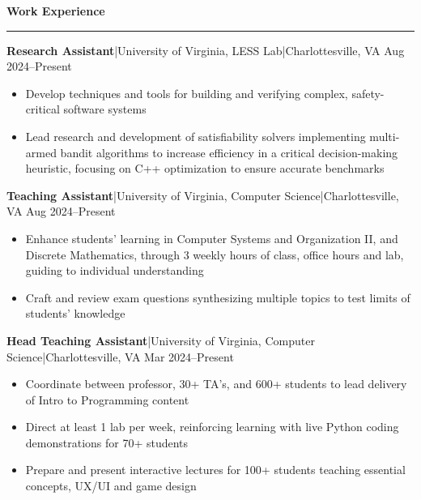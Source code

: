 \documentclass[11pt,letterpaper]{article}
\newcommand{\horibar}[2]{#1\hspace{5pt}|\hspace{5pt}#2}
\newcommand{\sep}[1]{\par\vspace{#1}}
\renewenvironment{section}[1]{
\sep{11pt}
{
\fontsize{14}{2}
\selectfont
\textbf{#1}\\[0.5pt]
}
\sep{6pt}
\noindent\rule{\linewidth}{0.5pt}
\sep{4pt}
}
{
}
\renewenvironment{subsection}[3]
{
\sep{4pt}
\horibar{\textbf{#1}}{#2} \hfill #3
\par\setstretch{1}
\begin{itemize}
}
{
\end{itemize}
\setstretch{0}
}
\begin{document}
\begin{section}{Work Experience}
    \begin{subsection}{Research Assistant}{\horibar{University of Virginia, LESS Lab}{Charlottesville, VA}}{Aug 2024–Present}
        \item Develop techniques and tools for building and verifying complex, safety-critical software systems 
        \item Lead research and development of satisfiability solvers implementing multi-armed bandit algorithms to increase efficiency in a critical decision-making heuristic, focusing on C++ optimization to ensure accurate benchmarks
    \end{subsection}
    \begin{subsection}{Teaching Assistant}{\horibar{University of Virginia, Computer Science}{Charlottesville, VA}}{Aug 2024–Present}
        \item Enhance students’ learning in Computer Systems and Organization II, and Discrete Mathematics, through 3 weekly hours of class, office hours and lab, guiding to individual understanding
        \item Craft and review exam questions synthesizing multiple topics to test limits of students’ knowledge
    \end{subsection}
    \begin{subsection}{Head Teaching Assistant}{\horibar{University of Virginia, Computer Science}{Charlottesville, VA}}{Mar 2024–Present}
        \item Coordinate between professor, 30+ TA's, and 600+ students to lead delivery of Intro to Programming content
        \item Direct at least 1 lab per week, reinforcing learning with live Python coding demonstrations for 70+ students
        \item Prepare and present interactive lectures for 100+ students teaching essential concepts, UX/UI and game design
    \end{subsection}
\end{section}
\end{document}
